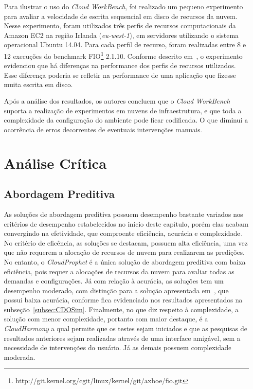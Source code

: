 Para ilustrar o uso do \textit{Cloud WorkBench}, foi realizado um pequeno experimento para avaliar a velocidade de escrita sequencial em disco de recursos da nuvem. Nesse experimento, foram utilizados três perfis de recursos computacionais da Amazon EC2 na região Irlanda (\textit{eu-west-1}), em servidores utilizando o sistema operacional Ubuntu 14.04. Para cada perfil de recurso, foram realizadas entre 8 e 12 execuções do benchmark FIO\footnote{http://git.kernel.org/cgit/linux/kernel/git/axboe/fio.git} 2.1.10. Conforme descrito em~\cite{scheuner2014cloud}, o experimento evidenciou que há diferenças na performance dos perfis de recursos utilizados. Esse diferença poderia se refletir na performance de uma aplicação que fizesse muita escrita em disco.

Após a análise dos resultados, os autores concluem que o \textit{Cloud WorkBench} suporta a realização de experimentos em nuvens de infraestrutura, e que toda a complexidade da configuração do ambiente pode ficar codificada. O que diminui a ocorrência de erros decorrentes de eventuais intervenções manuais.

\section{Análise Crítica}

\subsection{Abordagem Preditiva}
As soluções de abordagem preditiva possuem desempenho bastante variados nos
critérios de desempenho estabelecidos no início deste capítulo, porém elas
acabam convergindo na efetividade, que comproente eficiência, acurácia e
complexidade. No critério de eficência, as soluções se destacam, possuem
alta eficiência, uma vez que não requerem a alocação de recursos de nuvem para
realizarem as predições. No entanto, o \textit{CloudProphet} é a única solução
de abordagem preditiva com baixa eficiência, pois requer a alocações de recursos da nuvem para
avaliar todas as demandas e configurações. Já com relação à acurácia, as
soluções tem um desempenho moderado, com distinção para a solução apresentada
em~\cite{fittkau2012cdosim}, que possui baixa acurácia, conforme fica
evidenciado nos resultados apresentados na subseção~\ref{subsec:CDOSim}.
Finalmente, no que diz respeito à complexidade, a solução com menor
complexidade, portanto com maior destaque, é a \textit{CloudHarmony} a qual
permite que os testes sejam iniciados e que as pesquisas de resultados
anteriores sejam realizadas através de uma interface amigável, sem a necessidade de intervenções do usuário.
Já as demais possuem complexidade moderada.
 
